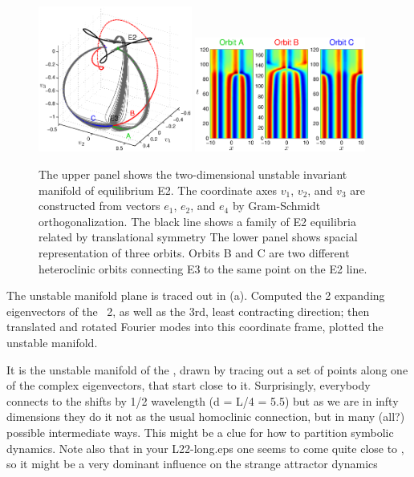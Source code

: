 \begin{figure}[h]\vspace*{-5pt} \centering
\includegraphics[width=0.45\textwidth]{figs/ks22_E3_manifold.eps}
\includegraphics[width=0.5\textwidth]{figs/ks22_E3_orbits.eps}
\vspace*{-5pt}\caption{ {\small The upper panel shows the two-dimensional
unstable invariant manifold of equilibrium E2. The coordinate axes
$v_1$, $v_2$, and $v_3$ are constructed from vectors
$e_1$, $e_2$, and $e_4$ by Gram-Schmidt orthogonalization.
The black line shows a family of E2 equilibria related by translational
symmetry The lower panel shows spacial representation of
three orbits. Orbits B and C are two different heteroclinic orbits
connecting E3 to the same point on the E2 line.}}
\label{f:KS22E3man}\vspace*{-5pt}
\end{figure}



The unstable manifold plane is traced out in
(a). Computed the 2 expanding eigenvectors
of the \eqv\ {\nameit}2, as well as the 3rd, least contracting
direction; then translated and rotated Fourier modes into this
coordinate frame, plotted the unstable manifold.


 It is the unstable manifold of the 
{\eqv}, drawn by tracing out a set of points along one of the complex
eigenvectors, that start close to it. Surprisingly, everybody connects
to the  shifts by 1/2 wavelength (d = L/4 = 5.5) but as we are in
infty dimensions they do it not as the usual homoclinic connection, but in
many (all?) possible intermediate ways. This might be a clue for how to
partition symbolic dynamics. Note also that in your L22-long.eps one seems
to come quite close to  {\eqv}, so it might be a very dominant
influence on the strange attractor dynamics


